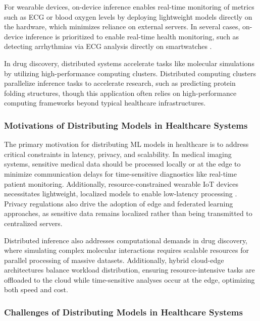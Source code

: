 \documentclass[conference]{IEEEtran}
\begin{document}
For wearable devices, on-device inference enables real-time monitoring of metrics such as ECG or blood oxygen levels by deploying lightweight models directly on the hardware, which minimizes reliance on external servers. In several cases, on-device inference is prioritized to enable real-time health monitoring, such as detecting arrhythmias via ECG analysis directly on smartwatches \cite{al2022machine}. 

In drug discovery, distributed systems accelerate tasks like molecular simulations by utilizing high-performance computing clusters. Distributed computing clusters parallelize inference tasks to accelerate research, such as predicting protein folding structures, though this application often relies on high-performance computing frameworks beyond typical healthcare infrastructures. \cite{tuli2020healthfog}


\subsubsection{Motivations of Distributing Models in Healthcare Systems}

The primary motivation for distributing ML models in healthcare is to address critical constraints in latency, privacy, and scalability. In medical imaging systems, sensitive medical data should be processed locally or at the edge to minimize communication delays for time-sensitive diagnostics like real-time patient monitoring. Additionally, resource-constrained wearable IoT devices necessitates lightweight, localized models to enable low-latency processing \cite{al2022machine}. Privacy regulations also drive the adoption of edge and federated learning approaches, as sensitive data remains localized rather than being transmitted to centralized servers.

Distributed inference also addresses computational demands in drug discovery, where simulating complex molecular interactions requires scalable resources for parallel processing of massive datasets. Additionally, hybrid cloud-edge architectures balance workload distribution, ensuring resource-intensive tasks are offloaded to the cloud while time-sensitive analyses occur at the edge, optimizing both speed and cost.

\subsubsection{Challenges of Distributing Models in Healthcare Systems}
\end{document}
